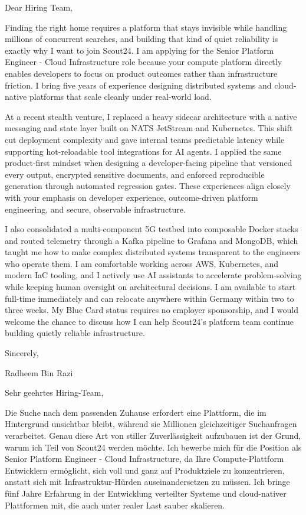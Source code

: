 \documentclass[11pt,a4paper]{coverletter}
\begin{document}

\opening{Dear Hiring Team,}

Finding the right home requires a platform that stays invisible while handling millions of concurrent searches, and building that kind of quiet reliability is exactly why I want to join Scout24. I am applying for the Senior Platform Engineer - Cloud Infrastructure role because your compute platform directly enables developers to focus on product outcomes rather than infrastructure friction. I bring five years of experience designing distributed systems and cloud-native platforms that scale cleanly under real-world load.

At a recent stealth venture, I replaced a heavy sidecar architecture with a native messaging and state layer built on NATS JetStream and Kubernetes. This shift cut deployment complexity and gave internal teams predictable latency while supporting hot-reloadable tool integrations for AI agents. I applied the same product-first mindset when designing a developer-facing pipeline that versioned every output, encrypted sensitive documents, and enforced reproducible generation through automated regression gates. These experiences align closely with your emphasis on developer experience, outcome-driven platform engineering, and secure, observable infrastructure.

I also consolidated a multi-component 5G testbed into composable Docker stacks and routed telemetry through a Kafka pipeline to Grafana and MongoDB, which taught me how to make complex distributed systems transparent to the engineers who operate them. I am comfortable working across AWS, Kubernetes, and modern IaC tooling, and I actively use AI assistants to accelerate problem-solving while keeping human oversight on architectural decisions. I am available to start full-time immediately and can relocate anywhere within Germany within two to three weeks. My Blue Card status requires no employer sponsorship, and I would welcome the chance to discuss how I can help Scout24’s platform team continue building quietly reliable infrastructure.

\closing{Sincerely,}{Radheem Bin Razi}

\clearpage
{}


\opening{Sehr geehrtes Hiring-Team,}

Die Suche nach dem passenden Zuhause erfordert eine Plattform, die im Hintergrund unsichtbar bleibt, während sie Millionen gleichzeitiger Suchanfragen verarbeitet. Genau diese Art von stiller Zuverlässigkeit aufzubauen ist der Grund, warum ich Teil von Scout24 werden möchte. Ich bewerbe mich für die Position als Senior Platform Engineer - Cloud Infrastructure, da Ihre Compute-Plattform Entwicklern ermöglicht, sich voll und ganz auf Produktziele zu konzentrieren, anstatt sich mit Infrastruktur-Hürden auseinandersetzen zu müssen. Ich bringe fünf Jahre Erfahrung in der Entwicklung verteilter Systeme und cloud-nativer Plattformen mit, die auch unter realer Last sauber skalieren.
\end{document}
